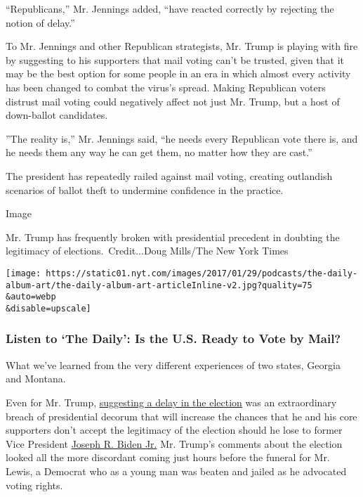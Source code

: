 ``Republicans,'' Mr. Jennings added, ``have reacted correctly by
rejecting the notion of delay.''

To Mr. Jennings and other Republican strategists, Mr. Trump is playing
with fire by suggesting to his supporters that mail voting can't be
trusted, given that it may be the best option for some people in an era
in which almost every activity has been changed to combat the virus's
spread. Making Republican voters distrust mail voting could negatively
affect not just Mr. Trump, but a host of down-ballot candidates.

''The reality is,'' Mr. Jennings said, ``he needs every Republican vote
there is, and he needs them any way he can get them, no matter how they
are cast.''

The president has repeatedly railed against mail voting, creating
outlandish scenarios of ballot theft to undermine confidence in the
practice.

Image

Mr. Trump has frequently broken with presidential precedent in doubting
the legitimacy of elections.~Credit...Doug Mills/The New York Times

\texttt{[image: https://static01.nyt.com/images/2017/01/29/podcasts/the-daily-album-art/the-daily-album-art-articleInline-v2.jpg?quality=75\\\&auto=webp\\\&disable=upscale]}

\hypertarget{listen-to-the-daily-is-the-us-ready-to-vote-by-mail}{%
\subsubsection{Listen to `The Daily': Is the U.S. Ready to Vote by
Mail?}\label{listen-to-the-daily-is-the-us-ready-to-vote-by-mail}}

What we've learned from the very different experiences of two states,
Georgia and Montana.

Even for Mr. Trump,
\href{https://twitter.com/realDonaldTrump/status/1288818160389558273?s=20}{suggesting
a delay in the election} was an extraordinary breach of presidential
decorum that will increase the chances that he and his core supporters
don't accept the legitimacy of the election should he lose to former
Vice President
\href{https://www.nytimes.com/interactive/2020/us/elections/joe-biden.html}{Joseph
R. Biden Jr.} Mr. Trump's comments about the election looked all the
more discordant coming just hours before the funeral for Mr. Lewis, a
Democrat who as a young man was beaten and jailed as he advocated voting
rights.

